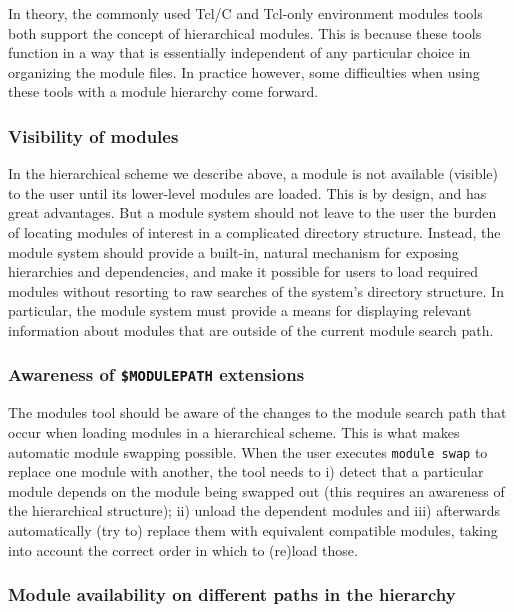 In theory, the commonly used Tcl/C and Tcl-only environment modules tools
both support the concept of hierarchical modules. This is because these tools
function in a way that is essentially independent of any particular choice in
organizing the module files. In practice however, some difficulties when using these tools
with a module hierarchy come forward.

\subsubsection{Visibility of modules}
\label{sec:hierarchical_consequences_visibility}

In the hierarchical scheme we describe above, a module is not available (visible)
to the user until its lower-level modules are loaded.  This
is by design, and has great advantages. But a module system should not leave to the
user the burden of locating modules of interest in a complicated directory structure.  Instead, the module system should provide a built-in, natural mechanism for exposing hierarchies and
dependencies, and make it possible for users to load required modules
without resorting to raw searches of the system's directory structure. In particular, the module system must provide a means for
displaying relevant information about modules that are outside of the
current module search path.

\subsubsection{Awareness of \texttt{\small \$MODULEPATH} extensions}
\label{sec:hierarchical_consequences_extensions}

The modules tool should be aware of the changes to the module search path that
occur when loading modules in a hierarchical scheme. This is what makes
automatic module swapping possible. When the user executes \texttt{\small module swap} to replace one module with another, the tool needs to i) detect that a particular
module depends on the module being swapped out (this requires an awareness of
the hierarchical structure); ii) unload the dependent
modules and iii) afterwards
automatically (try to) replace them with equivalent compatible modules, taking into
account the correct order in which to (re)load those.

\subsubsection{Module availability on different paths in the hierarchy}
\label{sec:hierarchical_consequences_availability}

